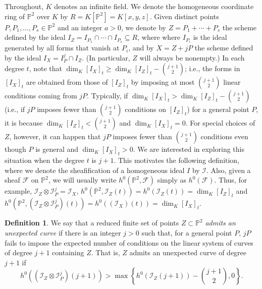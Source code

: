 \documentclass[12pt]{amsart}
\numberwithin{equation}{section}
\theoremstyle{definition}
\newtheorem{definition}[theorem]{Definition}
\begin{document}
Throughout, $K$ denotes an infinite field. We denote the homogeneous coordinate ring of ${ \ensuremath{\mathbb{P}}}^2$ over $K$ by $R = K[{ \ensuremath{\mathbb{P}}}^2]=K[x,y,z]$.
Given distinct points $P, P_1,\ldots,P_s\in{ \ensuremath{\mathbb{P}}}^2$ and an integer $a>0$, we denote by 
$Z=P_1+\cdots+P_s$ the scheme defined by the ideal $I_Z=I_{P_1}\cap \cdots \cap I_{P_s}\subseteq R$,
where where $I_{P_i}$ is the ideal generated by all forms that vanish at $P_i$, and by 
$X=Z+jP$ the scheme defined by the ideal $I_X=I_P^j\cap I_Z$. 
(In particular, $Z$ will always be nonempty.)
In each degree $t$, note that $\dim_K [I_X]_t \geq \dim_K [I_Z]_t-\binom{j+1}{2}$;
i.e., the forms in $[I_X]_t$ are obtained from those of $[I_Z]_t$ by imposing at most
$\binom{j+1}{2}$ linear conditions coming from $jP$. Typically, if $\dim_K [I_X]_t > \dim_K [I_Z]_t-\binom{j+1}{2}$ 
(i.e., if $jP$ imposes fewer than $\binom{j+1}{2}$ conditions on $[I_Z]_t$)
for a general point $P$, it is because $\dim_K [I_Z]_t<\binom{j+1}{2}$ and $\dim_K [I_X]_t = 0$.
For special choices of $Z$, however, it can happen that $jP$ imposes fewer than
$\binom{j+1}{2}$ conditions even though $P$ is general and $\dim_K [I_X]_t >0$.
We are interested in exploring this situation when the degree $t$ is $j+1$.
This motivates the following definition, where we denote the sheafification
of a homogeneous ideal $I$ by $\mathcal I$. Also, given a sheaf $\mathcal F$ on ${ \ensuremath{\mathbb{P}}}^2$, 
we will usually write $h^0({ \ensuremath{\mathbb{P}}}^2, {\mathcal F})$ simply as $h^0({\mathcal F})$.
Thus, for example, $\mathcal I_Z \otimes \mathcal I_P^j=\mathcal I_X$,
$h^0({ \ensuremath{\mathbb{P}}}^2, {\mathcal I}_Z(t))=h^0({\mathcal I}_Z(t))=\dim_K [I_Z]_t$ and 
$h^0({ \ensuremath{\mathbb{P}}}^2,(\mathcal I_Z \otimes \mathcal I_P^j)(t))=h^0((\mathcal I_X)(t))=\dim_K [I_X]_t$. 

\begin{definition}
    \label{def:unexpected curve}
We say that a reduced finite set of points $Z \subset { \ensuremath{\mathbb{P}}}^2$  {\em admits an unexpected curve} if there is an integer $j>0$ such that, 
for a general point $P$, $jP$ fails to impose the expected number of conditions on the linear system of curves of 
degree $j+1$ containing $Z$. That is, $Z$ admits an unexpected curve of degree $j+1$ if 
\begin{equation}
  \label{eq:unexpected}
h^0((\mathcal I_Z \otimes \mathcal I_P^j)(j+1)) > \max \left  \{ h^0(\mathcal I_Z(j+1)) - \binom{j+1}{2}, 0 \right \}.
\end{equation}
\end{definition}
\end{document}
